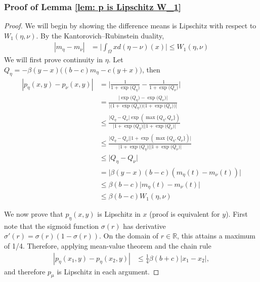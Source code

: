 \documentclass[10pt]{article}
\begin{document}
\subsubsection*{Proof of Lemma \ref{lem: p is Lipschitz W_1}}
\begin{proof}
We will begin by showing the difference means is Lipschitz with respect to $W_1(\eta,\nu)$. By the Kantorovich--Rubinstein duality, 
\begin{align*}
    |m_{\eta}-m_{\nu}| &= \Big|\int_\Omega xd(\eta-\nu)(x)\Big| \leq W_1(\eta,\nu)
\end{align*}
We will first prove continuity in $\eta$. Let $Q_\eta = -\beta(y-x)\Big((b-c)m_\eta-c(y+x)\Big)$, then
\begin{align*}
    |p_{\eta}(x,y) - p_{\nu}(x,y)| &= \bigg|\frac{1}{1+\exp\big(Q_\eta\big)}-\frac{1}{1+\exp\big(Q_\nu\big)}\bigg|\\
    &= \frac{\Big|\exp\big(Q_\eta\big)- \exp\big(Q_\nu\big)\Big|}{\Big|\Big(1+\exp\big(Q_\eta\big)\Big)\Big(1+ \exp\big(Q_\nu\big)\Big)\Big|}\\
    &\leq \frac{\Big|Q_\eta-Q_\nu\Big|\exp({\max{\{Q_\eta,Q_\nu\}}})}{\Big|1+\exp\big(Q_\eta\big)\Big|\Big|1+ \exp\big(Q_\nu\big)\Big|}\\
    &\leq \frac{\Big|Q_\eta-Q_\nu\Big|\Big|1+\exp({\max{\{Q_\eta,Q_\nu\}}})\Big|}{\Big|1+\exp\big(Q_\eta\big)\Big|\Big|1+ \exp\big(Q_\nu\big)\Big|}\\
    &\leq \Big|Q_\eta-Q_\nu\Big|\\
    &= \Big|\beta(y-x)(b-c)(m_{\eta}(t) - m_{\nu}(t))\Big|\\
    &\leq \beta (b-c)\Big|m_{\eta}(t) - m_{\nu}(t)\Big|\\
    &\leq \beta (b-c)W_1(\eta,\nu)
\end{align*}

We now prove that $p_\eta(x,y)$ is Lipschitz in $x$ (proof is equivalent for $y$). First note that the sigmoid function $\sigma(r)$ has derivative $\sigma'(r) = \sigma(r)(1-\sigma(r))$. On the domain of $r \in \mathbb{R}$, this attains a maximum of 1/4. Therefore, applying mean-value theorem and the chain rule
     \begin{align*}
         |p_\eta(x_1,y) - p_\eta(x_2,y)| &\leq \frac{1}{4}\beta(b +c)| x_1 - x_2|,
     \end{align*}
and therefore $p_\mu$ is Lipschitz in each argument.
\end{proof}
\end{document}
